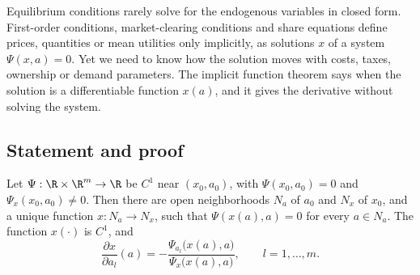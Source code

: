 Equilibrium conditions rarely solve for the endogenous variables in closed form. First-order conditions,
market-clearing conditions and share equations define prices, quantities or mean utilities only implicitly, as
solutions $x$ of a system $\Psi(x, a) = 0$. Yet we need to know how the solution moves with costs, taxes, ownership
or demand parameters. The implicit function theorem says when the solution is a differentiable function $x(a)$,
and it gives the derivative without solving the system.

\subsection{Statement and proof}\label{sec:B-ift-statement}

\begin{theorem}\label{thm:B-ift-scalar}
Let $\Psi : \R \times \R^m \to \R$ be $C^1$ near $(x_0, a_0)$, with $\Psi(x_0, a_0) = 0$ and $\Psi_x(x_0, a_0) \neq 0$.
Then there are open neighborhoods $N_a$ of $a_0$ and $N_x$ of $x_0$, and a unique function $x : N_a \to N_x$, such that
$\Psi(x(a), a) = 0$ for every $a \in N_a$. The function $x(\cdot)$ is $C^1$, and
\begin{equation}\label{eq:B-ift-scalar}
\frac{\partial x}{\partial a_l}(a) = -\frac{\Psi_{a_l}\big(x(a), a\big)}{\Psi_x\big(x(a), a\big)} , \qquad l = 1, \dots, m .
\end{equation}
\end{theorem}

